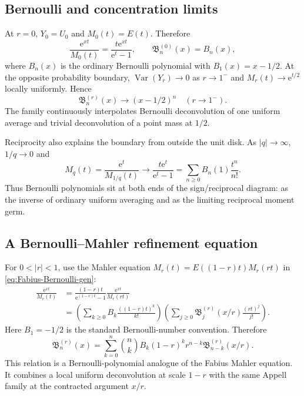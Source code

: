 \documentclass[11pt,oneside]{article}
\numberwithin{equation}{section}
\theoremstyle{definition}
\theoremstyle{remark}
\newcommand{\Var}{\operatorname{Var}}
\newcommand{\e}{\mathrm e}
\newcommand{\Br}{\mathfrak B}
\begin{document}
\subsection{Bernoulli and concentration limits}

At $r=0$, $Y_0=U_0$ and $M_0(t)=E(t)$.  Therefore
\begin{equation}
 \frac{\e^{xt}}{M_0(t)}=\frac{t\e^{xt}}{\e^t-1},
 \qquad
 \boxed{\Br_n^{(0)}(x)=B_n(x),}
 \label{eq:Bernoulli-boundary}
\end{equation}
where $B_n(x)$ is the ordinary Bernoulli polynomial with
$B_1(x)=x-1/2$.  At the opposite probability boundary,
$\Var(Y_r)\to0$ as $r\to1^-$ and $M_r(t)\to\e^{t/2}$ locally uniformly.
Hence
\begin{equation}
 \boxed{
 \Br_n^{(r)}(x)\longrightarrow(x-1/2)^n
 \quad(r\to1^-).}
 \label{eq:Appell-concentration}
\end{equation}
The family continuously interpolates Bernoulli deconvolution of one uniform
average and trivial deconvolution of a point mass at $1/2$.

Reciprocity also explains the boundary from outside the unit disk.  As
$|q|\to\infty$, $1/q\to0$ and
\begin{equation}
 M_q(t)=\frac{\e^t}{M_{1/q}(t)}
 \longrightarrow \frac{t\e^t}{\e^t-1}
 =\sum_{n\ge0}B_n(1)\frac{t^n}{n!}.
 \label{eq:reciprocal-Bernoulli-limit}
\end{equation}
Thus Bernoulli polynomials sit at both ends of the sign/reciprocal diagram:
as the inverse of ordinary uniform averaging and as the limiting reciprocal
moment germ.

\subsection{A Bernoulli--Mahler refinement equation}

For $0<|r|<1$, use the Mahler equation $M_r(t)=E((1-r)t)M_r(rt)$ in
\eqref{eq:Fabius-Bernoulli-gen}:
\begin{align}
 \frac{\e^{xt}}{M_r(t)}
 &=\frac{(1-r)t}{\e^{(1-r)t}-1}
   \frac{\e^{xt}}{M_r(rt)}\nonumber\\
 &=\left(\sum_{k\ge0}B_k\frac{((1-r)t)^k}{k!}\right)
   \left(\sum_{j\ge0}\Br_j^{(r)}(x/r)\frac{(rt)^j}{j!}\right).
 \label{eq:Appell-Mahler-gen}
\end{align}
Here $B_1=-1/2$ is the standard Bernoulli-number convention.  Therefore
\begin{equation}
 \boxed{
 \Br_n^{(r)}(x)=
 \sum_{k=0}^{n}\binom nk
 B_k(1-r)^kr^{n-k}\Br_{n-k}^{(r)}(x/r).}
 \label{eq:Appell-Mahler}
\end{equation}
This relation is a Bernoulli-polynomial analogue of the Fabius Mahler equation.
It combines a local uniform deconvolution at scale $1-r$ with the same Appell
family at the contracted argument $x/r$.
\end{document}
